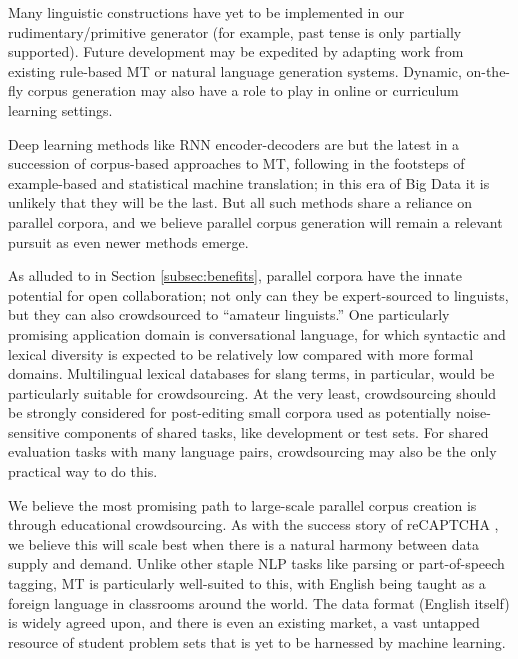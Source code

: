 Many linguistic constructions have yet to be implemented in our rudimentary/primitive generator (for example, past tense is only partially supported).
Future development may be expedited by adapting work from existing rule-based MT or natural language generation systems. 
Dynamic, on-the-fly corpus generation may also have a role to play in online or curriculum learning settings.

Deep learning methods like RNN encoder-decoders  are but the latest in a succession of corpus-based approaches to MT, following in the footsteps of example-based and statistical machine translation; in this era of Big Data it is unlikely that they will be the last.
But all such methods share a reliance on parallel corpora, and we believe parallel corpus generation will remain a relevant pursuit as even newer methods emerge.

As alluded to in Section \ref{subsec:benefits}, parallel corpora have the innate potential for open collaboration; not only can they be expert-sourced to linguists, but they can also crowdsourced to ``amateur linguists.''
One particularly promising application domain is conversational language, for which syntactic and lexical diversity is expected to be relatively low compared with more formal domains. 
Multilingual lexical databases for slang terms, in particular, would be particularly suitable for crowdsourcing.
At the very least, crowdsourcing should be strongly considered for post-editing small corpora used as potentially noise-sensitive components of shared tasks, like development or test sets.
For shared evaluation tasks with many language pairs, crowdsourcing may also be the only practical way to do this.

We believe the most promising path to large-scale parallel corpus creation is through educational crowdsourcing.
As with the success story of reCAPTCHA , we believe this will scale best when there is a natural harmony between data supply and demand.
Unlike other staple NLP tasks like parsing or part-of-speech tagging, MT is particularly well-suited to this, with English being taught as a foreign language in classrooms around the world.
The data format (English itself) is widely agreed upon, and there is even an existing market, a vast untapped resource of student problem sets that is yet to be harnessed by machine learning.

